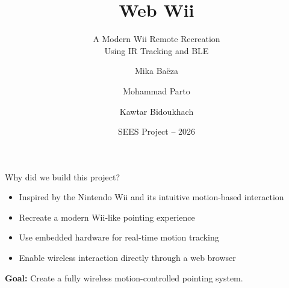 \documentclass[aspectratio=169]{beamer}
\title{Web Wii}
\subtitle{
A Modern Wii Remote Recreation\\
Using IR Tracking and BLE
}
\author{
Mika Baëza \and Mohammad Parto \and Kawtar Bidoukhach
}
\date{SEES Project -- 2026}
\begin{document}

\frame{\titlepage}


\begin{frame}{Why did we build this project?}
  \vspace{0pt plus 0.3filll}
  \begin{itemize}\setlength\itemsep{0.55em}
    \item Inspired by the Nintendo Wii and its intuitive motion-based interaction
    \item Recreate a modern Wii-like pointing experience
    \item Use embedded hardware for real-time motion tracking
    \item Enable wireless interaction directly through a web browser
  \end{itemize}
  \vspace{0pt plus 1filll}
  \begin{center}
    \large\textbf{Goal:} Create a fully wireless motion-controlled pointing system.
  \end{center}
  \vspace{0pt plus 1filll}
\end{frame}
% 
\end{document}
